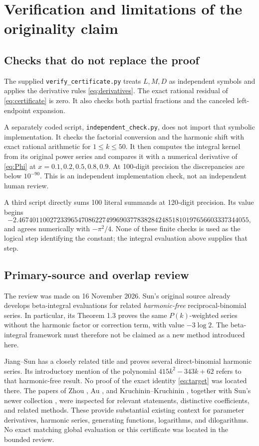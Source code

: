 \documentclass[11pt,a4paper]{article}
\numberwithin{equation}{section}
\begin{document}
\section{Verification and limitations of the originality claim}
\subsection{Checks that do not replace the proof}
The supplied \texttt{verify\_certificate.py} treats $L,M,D$ as independent symbols and applies the derivative rules \eqref{eq:derivatives}. The exact rational residual of \eqref{eq:certificate} is zero. It also checks both partial fractions and the canceled left-endpoint expansion.

A separately coded script, \texttt{independent\_check.py}, does not import that symbolic implementation. It checks the factorial conversion and the harmonic shift with exact rational arithmetic for $1\le k\le50$. It then computes the integral kernel from its original power series and compares it with a numerical derivative of \eqref{eq:Phi} at $x=0.1,0.2,0.5,0.8,0.9$. At 100-digit precision the discrepancies are below $10^{-90}$. This is an independent implementation check, not an independent human review.

A third script directly sums 100 literal summands at 120-digit precision. Its value begins
\[
 -2.467401100272339654708622749969037783828424851810197656603337344055,
\]
and agrees numerically with $-\pi^2/4$. None of these finite checks is used as the logical step identifying the constant; the integral evaluation above supplies that step.

\subsection{Primary-source and overlap review}
The review was made on 16 November 2026. Sun's original source \cite{Sun} already develops beta-integral evaluations for related \emph{harmonic-free} reciprocal-binomial series. In particular, its Theorem 1.3 proves the same $P(k)$-weighted series without the harmonic factor or correction term, with value $-3\log2$. The beta-integral framework must therefore not be claimed as a new method introduced here.

Jiang--Sun \cite{JS} has a closely related title and proves several direct-binomial harmonic series. Its introductory mention of the polynomial $415k^2-343k+62$ refers to that harmonic-free result. No proof of the exact identity \eqref{eq:target} was located there. The papers of Zhou \cite{Zhou}, Au \cite{Au}, and Kruchinin--Kruchinin \cite{KK}, together with Sun's newer collection \cite{SunNew}, were inspected for relevant statements, distinctive coefficients, and related methods. These provide substantial existing context for parameter derivatives, harmonic series, generating functions, logarithms, and dilogarithms. No exact matching global evaluation or this certificate was located in the bounded review.
\end{document}
